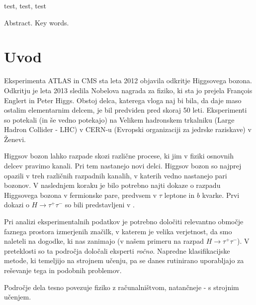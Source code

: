 \documentclass[11pt,a4paper,openany]{book}
\begin{document}
\vspace{0.5cm}
\noindent test, test, test


Abstract. Key words.







\chapter*{Uvod}

Eksperimenta ATLAS in CMS sta leta 2012 objavila odkritje Higgsovega bozona\cite{Aad20121,Chatrchyan201230}. Odkritju je leta 2013 sledila Nobelova nagrada za fiziko, ki sta jo prejela François Englert in Peter Higgs. Obstoj delca, katerega vloga naj bi bila, da daje maso ostalim elementarnim delcem, je bil predviden pred skoraj 50 leti. Eksperimenti so potekali (in še vedno potekajo) na Velikem hadronskem trkalniku (Large Hadron Collider - LHC) v CERN-u (Evropski organizaciji za jedrske raziskave) v Ženevi\cite{ChallengeDoc}.

Higgsov bozon lahko razpade skozi različne procese, ki jim v fiziki osnovnih delcev pravimo kanali. Pri tem nastanejo novi delci. Higgsov bozon so najprej opazili v treh različnih razpadnih kanalih, v katerih vedno nastanejo pari bozonov. V naslednjem koraku je bilo potrebno najti dokaze o razpadu Higgsovega bozona v fermionske pare, predvsem v $\tau$ leptone in $b$ kvarke. Prvi dokazi o $H \rightarrow \tau^+\tau^-$ so bili predstavljeni v \cite{atlas2013}. 


Pri analizi eksperimentalnih podatkov je potrebno določiti relevantno območje faznega prostora izmerjenih značilk, v katerem je velika verjetnost, da smo naleteli na dogodke, ki nas zanimajo (v našem primeru na razpad $H \rightarrow \tau^+\tau^-$). V preteklosti so ta področja določali eksperti \textit{ročno}\cite{Adam-Bourdarios14}. Napredne klasifikacijske metode, ki temeljijo na strojnem učenju, pa se danes rutinirano uporabljajo za reševanje tega in podobnih problemov\cite{atlas2013}.

Področje dela tesno povezuje fiziko z računalništvom, natančneje - s strojnim učenjem. 
\end{document}
